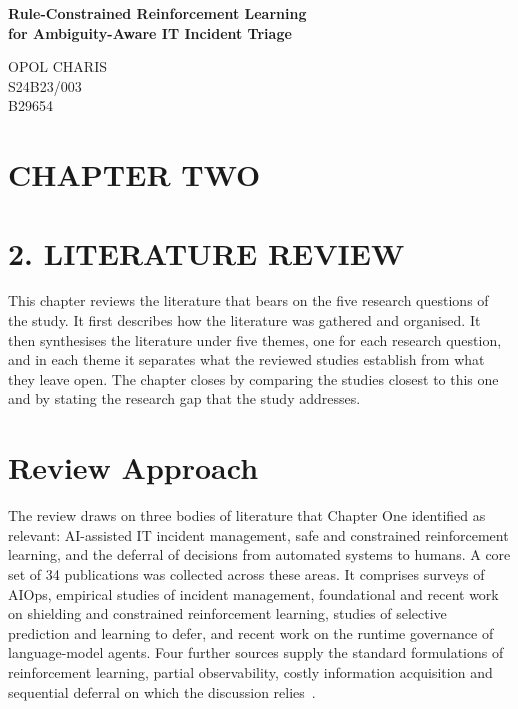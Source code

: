\documentclass[12pt,a4paper]{article}
\begin{document}
\begin{center}
  {\LARGE\bfseries Rule-Constrained Reinforcement Learning\\for Ambiguity-Aware IT Incident Triage\par}
  \vspace{1.5em}
  {\large OPOL CHARIS\\
  S24B23/003\\
  B29654\par}
\end{center}
\vspace{1.5em}

\section*{CHAPTER TWO}

\section*{2. LITERATURE REVIEW}

This chapter reviews the literature that bears on the five research questions of the study. It first describes how the literature was gathered and organised. It then synthesises the literature under five themes, one for each research question, and in each theme it separates what the reviewed studies establish from what they leave open. The chapter closes by comparing the studies closest to this one and by stating the research gap that the study addresses.

\section{Review Approach}

The review draws on three bodies of literature that Chapter One identified as relevant: AI-assisted IT incident management, safe and constrained reinforcement learning, and the deferral of decisions from automated systems to humans. A core set of 34 publications was collected across these areas. It comprises surveys of AIOps, empirical studies of incident management, foundational and recent work on shielding and constrained reinforcement learning, studies of selective prediction and learning to defer, and recent work on the runtime governance of language-model agents. Four further sources supply the standard formulations of reinforcement learning, partial observability, costly information acquisition and sequential deferral on which the discussion relies~\cite{sutton2018,kaelbling1998,janisch2019,joshi2023}.
\end{document}
